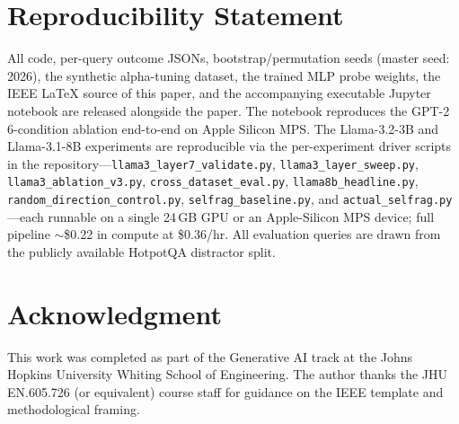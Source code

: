 \documentclass[conference]{IEEEtran}
\begin{document}
\section*{Reproducibility Statement}

All code, per-query outcome JSONs, bootstrap/permutation seeds (master seed: 2026), the synthetic alpha-tuning dataset, the trained MLP probe weights, the IEEE LaTeX source of this paper, and the accompanying executable Jupyter notebook are released alongside the paper. The notebook reproduces the GPT-2 6-condition ablation end-to-end on Apple Silicon MPS. The Llama-3.2-3B and Llama-3.1-8B experiments are reproducible via the per-experiment driver scripts in the repository---\texttt{llama3\_layer7\_validate.py}, \texttt{llama3\_layer\_sweep.py}, \texttt{llama3\_ablation\_v3.py}, \texttt{cross\_dataset\_eval.py}, \texttt{llama8b\_headline.py}, \texttt{random\_direction\_control.py}, \texttt{selfrag\_baseline.py}, and \texttt{actual\_selfrag.py}---each runnable on a single 24\,GB GPU or an Apple-Silicon MPS device; full pipeline $\sim$\$0.22 in compute at \$0.36/hr. All evaluation queries are drawn from the publicly available HotpotQA distractor split.

\section*{Acknowledgment}

This work was completed as part of the Generative AI track at the Johns Hopkins University Whiting School of Engineering. The author thanks the JHU EN.605.726 (or equivalent) course staff for guidance on the IEEE template and methodological framing.
\end{document}
